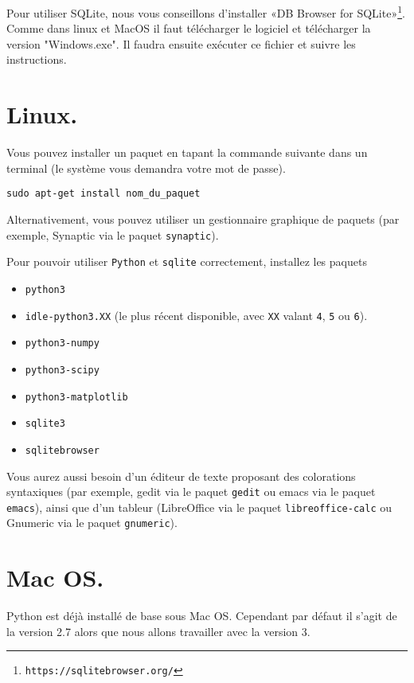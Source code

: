 \documentclass[francais,a4paper,DIV=16]{scrartcl}
\begin{document}
Pour utiliser SQLite, nous vous conseillons d'installer «DB Browser for SQLite»\footnote{\texttt{https://sqlitebrowser.org/}}. Comme dans linux et MacOS il faut télécharger le logiciel et télécharger la version "Windows.exe". Il faudra ensuite exécuter ce fichier et suivre les instructions.

\section{Linux.}\label{installation:sec:linux}

Vous pouvez installer un paquet en tapant la commande suivante dans un terminal (le système vous demandra votre mot de passe). 
\begin{verbatim}
sudo apt-get install nom_du_paquet
\end{verbatim}
Alternativement, vous pouvez utiliser un gestionnaire graphique de paquets (par exemple, Synaptic via le paquet \texttt{synaptic}).

Pour pouvoir utiliser \texttt{Python} et \texttt{sqlite} correctement, installez les paquets 
\begin{itemize}
  \item \texttt{python3}
  \item \texttt{idle-python3.XX} (le plus récent disponible, avec \texttt{XX} valant \texttt{4}, \texttt{5} ou \texttt{6}).
  \item \texttt{python3-numpy}
  \item \texttt{python3-scipy}
  \item \texttt{python3-matplotlib}
  \item \texttt{sqlite3}
  \item \texttt{sqlitebrowser}
\end{itemize}

Vous aurez aussi besoin d'un éditeur de texte proposant des colorations syntaxiques (par exemple, gedit via le paquet \texttt{gedit} ou emacs via le paquet \texttt{emacs}), ainsi que d'un tableur (LibreOffice via le paquet \texttt{libreoffice-calc} ou Gnumeric via le paquet \texttt{gnumeric}).

\section{Mac OS.}

Python est déjà installé de base sous Mac OS. Cependant par défaut il s'agit de la version 2.7 alors que nous allons travailler avec la version 3.
\end{document}
